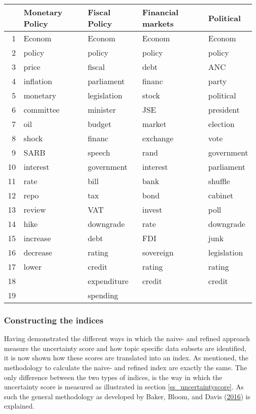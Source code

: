 \documentclass[11pt,preprint, authoryear]{elsarticle}
\let\origtable\table
\let\endorigtable\endtable
\renewenvironment{table}[1][2] {
    \expandafter\origtable\expandafter[H]
} {
    \endorigtable
}
\numberwithin{equation}{section}
\numberwithin{figure}{section}
\numberwithin{table}{section}
\begin{document}
\begin{table}[H]
\caption{Keywords per Index category \label{tbl_keywords}} 
\centering
\begin{tabular}{rllll}
  \hline
 & Monetary Policy & Fiscal Policy & Financial markets & Political \\ 
  \hline
1 & Econom & Econom & Econom & Econom \\ 
  2 & policy & policy & policy & policy \\ 
  3 & price & fiscal & debt & ANC \\ 
  4 & inflation & parliament & financ & party \\ 
  5 & monetary & legislation & stock & political \\ 
  6 & committee & minister & JSE & president \\ 
  7 & oil & budget & market & election \\ 
  8 & shock & financ & exchange & vote \\ 
  9 & SARB & speech & rand & government \\ 
  10 & interest & government & interest & parliament \\ 
  11 & rate & bill & bank & shuffle \\ 
  12 & repo & tax & bond & cabinet \\ 
  13 & review & VAT & invest & poll \\ 
  14 & hike & downgrade & rate & downgrade \\ 
  15 & increase & debt & FDI & junk \\ 
  16 & decrease & rating & sovereign & legislation \\ 
  17 & lower & credit & rating & rating \\ 
  18 &  & expenditure & credit & credit \\ 
  19 &  & spending &  &  \\ 
   \hline
\end{tabular}
\end{table}

\subsubsection{\texorpdfstring{Constructing the indices
\label{ss_indices}}{Constructing the indices }}\label{constructing-the-indices}

Having demonstrated the different ways in which the naive- and refined
approach measure the uncertainty score and how topic specific data
subsets are identified, it is now shown how these scores are translated
into an index. As mentioned, the methodology to calculate the naive- and
refined index are exactly the same. The only difference between the two
types of indices, is the way in which the uncertainty score is measured
as illustrated in section \ref{ss_uncertaintyscore}. As such the general
methodology as developed by Baker, Bloom, and Davis
(\protect\hyperlink{ref-Baker2016}{2016}) is explained.
\end{document}
